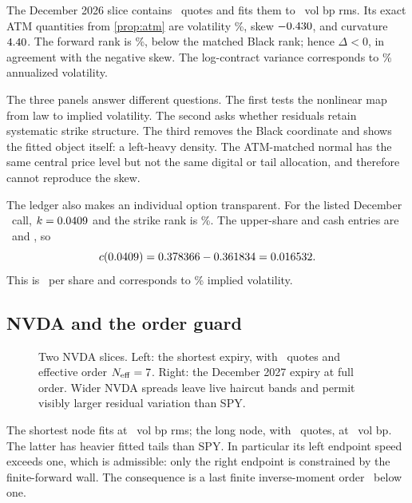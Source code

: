 The December 2026 slice contains \MacSpyDecNQuotes\ quotes and fits them to
\MacSpyDecRmsBp\ vol bp rms.  Its exact ATM quantities from
\cref{prop:atm} are volatility \MacSpyDecAtmVolPct\%, skew
$-0.430$, and curvature $4.40$.  The forward rank is
\MacSpyDecForwardRankPct\%, below the matched Black rank; hence
$\Delta<0$, in agreement with the negative skew.  The log-contract variance
corresponds to \MacSpyDecVarSwapPct\% annualized volatility.

The three panels answer different questions.  The first tests the nonlinear
map from law to implied volatility.  The second asks whether residuals retain
systematic strike structure.  The third removes the Black coordinate and
shows the fitted object itself: a left-heavy density.  The ATM-matched normal
has the same central price level but not the same digital or tail allocation,
and therefore cannot reproduce the skew.

The ledger also makes an individual option transparent.  For the listed
December \MacTicketStrike\ call, $k=0.0409$ and the strike rank is
\MacTicketRankPct\%.  The upper-share and cash entries are
\MacTicketShare\ and \MacTicketCash, so
\[
c(0.0409)=0.378366-0.361834=0.016532.
\]
This is \MacTicketDollarPrice\ per share and corresponds to
\MacTicketIvPct\% implied volatility.

\subsection{NVDA and the order guard}

\begin{figure}[htbp]
\centering
{}
\caption{Two NVDA slices.  Left: the shortest expiry, with
\MacNvdaOneDayNQuotes\ quotes and effective order
$N_{\rm eff}=7$.  Right: the December 2027 expiry at
full order.  Wider NVDA spreads leave live haircut bands and permit visibly
larger residual variation than SPY.}
\label{fig:nvda_nodes}
\end{figure}

The shortest node fits at \MacNvdaOneDayRmsBp\ vol bp rms; the long node, with
\MacNvdaLongNQuotes\ quotes, at \MacNvdaLongRmsBp\ vol bp.  The latter has
heavier fitted tails than SPY.  In particular its left endpoint speed exceeds
one, which is admissible: only the right endpoint is constrained by the
finite-forward wall.  The consequence is a last finite inverse-moment order
\MacNvdaLongMomentLeft\ below one.

